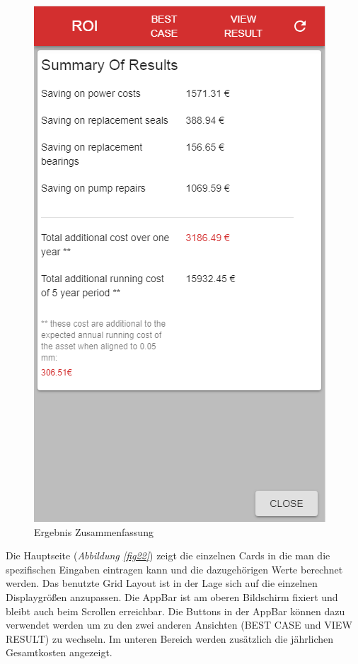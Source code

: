 \documentclass{article}
\begin{document}
\begin{figure}
				\includegraphics[scale=0.38]{Bilder/18.png}
				\centering
				\vspace{0 cm}
				\caption{Ergebnis Zusammenfassung}
				\label{fig24}
				
			\end{figure}
			
		
			Die Hauptseite (\textit{Abbildung \ref{fig22}}) zeigt die einzelnen Cards in die man die spezifischen Eingaben eintragen kann und die dazugehörigen Werte berechnet werden. Das benutzte Grid Layout ist in der Lage sich auf die einzelnen Displaygrößen anzupassen.
			Die AppBar ist am oberen Bildschirm fixiert und bleibt auch beim Scrollen erreichbar. Die Buttons in der AppBar können dazu verwendet werden um zu den zwei anderen Ansichten (BEST CASE und VIEW RESULT) zu wechseln. Im unteren Bereich werden zusätzlich die jährlichen Gesamtkosten angezeigt.
\end{document}

